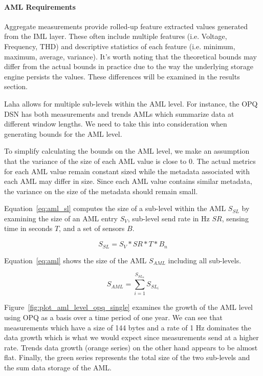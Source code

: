 \paragraph{AML Requirements}
Aggregate measurements provide rolled-up feature extracted values generated from the IML layer. These often include multiple features (i.e. Voltage, Frequency, THD) and descriptive statistics of each feature (i.e. minimum, maximum, average, variance). It's worth noting that the theoretical bounds may differ from the actual bounds in practice due to the way the underlying storage engine persists the values. These differences will be examined in the results section.

Laha allows for multiple sub-levels within the AML level. For instance, the OPQ DSN has both measurements and trends AMLs which summarize data at different window lengths. We need to take this into consideration when generating bounds for the AML level.

To simplify calculating the bounds on the AML level, we make an assumption that the variance of the size of each AML value is close to 0. The actual metrics for each AML value remain constant sized while the metadata associated with each AML may differ in size. Since each AML value contains similar metadata, the variance on the size of the metadata should remain small.

Equation~\ref{eq:aml_sl} computes the size of a sub-level within the AML $S_{SL}$ by examining the size of an AML entry $S_{V}$, sub-level send rate in Hz $SR$, sensing time in seconds $T$, and a set of sensors $B$.

\begin{equation}\label{eq:aml_sl}
	S_{SL} = S_{V} * SR * T * B_{n}
\end{equation}

Equation~\ref{eq:aml} shows the size of the AML $S_{AML}$ including all sub-levels.

\begin{equation}\label{eq:aml}
	S_{AML} = \sum_{i=1}^{S_{SL_{n}}} S_{SL_{i}}
\end{equation}

Figure~\ref{fig:plot_aml_level_opq_single} examines the growth of the AML level using OPQ as a basis over a time period of one year. We can see that measurements which have a size of 144 bytes and a rate of 1 Hz dominates the data growth which is what we would expect since measurements send at a higher rate. Trends data growth (orange series) on the other hand appears to be almost flat. Finally, the green series represents the total size of the two sub-levels and the sum data storage of the AML\@.

